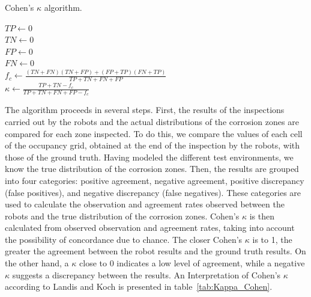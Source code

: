 \begin{algorithm}[h!]
	\caption{Cohen's $\kappa$ algorithm.}
	\label{alg:Cohen_Kappa}
	\KwResult{$\kappa \in [0, 1]$}
	$TP \gets 0$ \\
	$TN \gets 0$ \\
	$FP \gets 0$ \\
	$FN \gets 0$ \\
	$f_c \gets \frac{(TN + FN) (TN + FP) + (FP + TP) (FN + TP)}{TP + TN + FN +FP}$ \\
	$\kappa \gets \frac{TP + TN - f_c}{TP + TN + FN + FP - f_c}$
\end{algorithm}

The algorithm proceeds in several steps.
First, the results of the inspections carried out by the robots and the actual distributions of the corrosion zones are compared for each zone inspected.
To do this, we compare the values of each cell of the occupancy grid, obtained at the end of the inspection by the robots, with those of the ground truth.
Having modeled the different test environments, we know the true distribution of the corrosion zones.
Then, the results are grouped into four categories: positive agreement, negative agreement, positive discrepancy (false positives), and negative discrepancy (false negatives).
These categories are used to calculate the observation and agreement rates observed between the robots and the true distribution of the corrosion zones.
Cohen's $\kappa$ is then calculated from observed observation and agreement rates, taking into account the possibility of concordance due to chance.
The closer Cohen's $\kappa$ is to 1, the greater the agreement between the robot results and the ground truth results.
On the other hand, a $\kappa$ close to 0 indicates a low level of agreement, while a negative $\kappa$ suggests a discrepancy between the results.
An Interpretation of Cohen's $\kappa$ according to Landis and Koch is presented in table~\ref{tab:Kappa_Cohen}.

